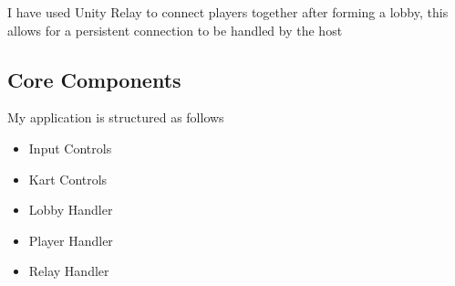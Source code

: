 I have used Unity Relay to connect players together after forming a lobby, this allows for a persistent connection to be handled by the host

\subsection{Core Components}

My application is structured as follows
\begin{itemize}
    \item Input Controls
    \item Kart Controls
    \item Lobby Handler
    \item Player Handler
    \item Relay Handler
\end{itemize}



